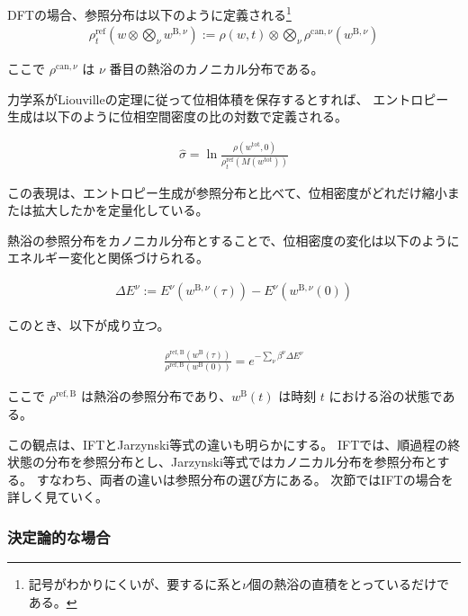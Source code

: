 \documentclass[a4paper,11pt]{jsarticle}
\numberwithin{equation}{section}
\begin{document}
DFTの場合、参照分布は以下のように定義される\footnote{記号がわかりにくいが、要するに系と$\nu$個の熱浴の直積をとっているだけである。}
\begin{align}
\rho_t^{\mathrm{ref}}\left(w \otimes \bigotimes_{\nu} w^{\mathrm{B}, \nu}\right)
:= \rho(w, t) \otimes \bigotimes_{\nu} \rho^{\mathrm{can}, \nu}(w^{\mathrm{B}, \nu})
\end{align}

ここで $\rho^{\mathrm{can}, \nu}$ は $\nu$ 番目の熱浴のカノニカル分布である。

力学系がLiouvilleの定理に従って位相体積を保存するとすれば、
エントロピー生成は以下のように位相空間密度の比の対数で定義される。

\begin{align}
\hat{\sigma} = \ln \frac{\rho(w^{\mathrm{tot}}, 0)}{\rho_t^{\mathrm{ref}}(M(w^{\mathrm{tot}}))}
\end{align}

この表現は、エントロピー生成が参照分布と比べて、位相密度がどれだけ縮小または拡大したかを定量化している。

熱浴の参照分布をカノニカル分布とすることで、位相密度の変化は以下のようにエネルギー変化と関係づけられる。

\begin{align}
\Delta E^{\nu} := E^{\nu}(w^{\mathrm{B}, \nu}(\tau)) - E^{\nu}(w^{\mathrm{B}, \nu}(0))
\end{align}

このとき、以下が成り立つ。

\begin{align}
\frac{\rho^{\mathrm{ref}, \mathrm{B}}(w^{\mathrm{B}}(\tau))}{\rho^{\mathrm{ref}, \mathrm{B}}(w^{\mathrm{B}}(0))}
= e^{-\sum_{\nu} \beta^{\nu} \Delta E^{\nu}}
\end{align}

ここで $\rho^{\mathrm{ref}, \mathrm{B}}$ は熱浴の参照分布であり、$w^{\mathrm{B}}(t)$ は時刻 $t$ における浴の状態である。

この観点は、IFTとJarzynski等式の違いも明らかにする。
IFTでは、順過程の終状態の分布を参照分布とし、Jarzynski等式ではカノニカル分布を参照分布とする。
すなわち、両者の違いは参照分布の選び方にある。
次節ではIFTの場合を詳しく見ていく。


\subsubsection{決定論的な場合}
\end{document}
